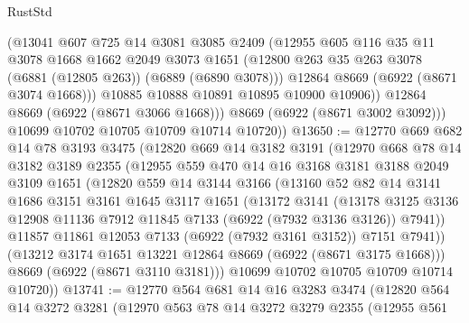 \begin{lexlean}{RustStd}
\begin{coremodule}
              (@13041
                @607
                @725
                @14
                @3081
                @3085
                @2409
                (@12955
                  @605
                  @116
                  @35
                  @11
                  @3078
                  @1668
                  @1662
                  @2049
                  @3073
                  @1651
                  (@12800 @263 @35 @263 @3078 (@6881 (@12805 @263)) (@6889 (@6890 @3078)))
                  @12864
                  @8669
                  (@6922 (@8671 @3074 @1668)))
                @10885
                @10888
                @10891
                @10895
                @10900
                @10906))
            @12864
            @8669
            (@6922 (@8671 @3066 @1668)))
          @8669
          (@6922 (@8671 @3002 @3092)))
        @10699
        @10702
        @10705
        @10709
        @10714
        @10720))
@13650 := @12770
    @669
    @682
    @14
    @78
    @3193
    @3475
    (@12820
      @669
      @14
      @3182
      @3191
      (@12970
        @668
        @78
        @14
        @3182
        @3189
        @2355
        (@12955
          @559
          @470
          @14
          @16
          @3168
          @3181
          @3188
          @2049
          @3109
          @1651
          (@12820
            @559
            @14
            @3144
            @3166
            (@13160
              @52
              @82
              @14
              @3141
              @1686
              @3151
              @3161
              @1645
              @3117
              @1651
              (@13172
                @3141
                (@13178
                  @3125
                  @3136
                  @12908
                  @11136
                  @7912
                  @11845
                  @7133
                  (@6922 (@7932 @3136 @3126))
                  @7941))
              @11857
              @11861
              @12053
              @7133
              (@6922 (@7932 @3161 @3152))
              @7151
              @7941))
          (@13212 @3174 @1651 @13221 @12864 @8669 (@6922 (@8671 @3175 @1668)))
          @8669
          (@6922 (@8671 @3110 @3181)))
        @10699
        @10702
        @10705
        @10709
        @10714
        @10720))
@13741 := @12770
    @564
    @681
    @14
    @16
    @3283
    @3474
    (@12820
      @564
      @14
      @3272
      @3281
      (@12970
        @563
        @78
        @14
        @3272
        @3279
        @2355
        (@12955
          @561

\end{coremodule}
\end{lexlean}
